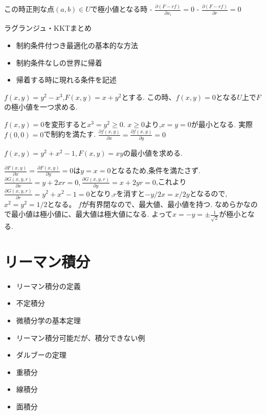 \documentclass{ujarticle}
\begin{document}
この時正則な点$(a,b) \in U$で極小値となる時
  - $\frac{ \partial (F - r f)}{\partial x_i} = 0$
  - $\frac{ \partial (F - r f)}{\partial r} = 0$

\begin{rem}
ラグランジュ・KKTまとめ
\begin{itemize}
\item 制約条件付つき最適化の基本的な方法
\item 制約条件なしの世界に帰着
\item 帰着する時に現れる条件を記述
\end{itemize}
\end{rem}

\begin{epl}
$f(x, y) = y^2 - x^3$,$F(x, y) = x + y^2$とする.
この時、$f(x, y) = 0$となる$U$上で$F$の極小値を一つ求める.
\end{epl}

$f(x, y)  = 0$を変形すると$x^3 = y^2 \ge 0$.
$x \ge 0$より,$x = y =0$が最小となる.
実際$f(0, 0) = 0$で制約を満たす.
$\frac{\partial f(x, y)}{\partial x} = \frac{\partial f(x, y)}{\partial y} = 0$

\begin{epl}
$f(x, y) = y^2 + x^2 - 1, F(x, y) = xy$の最小値を求める.
\end{epl}
$\frac{\partial F(x, y)}{\partial x} = \frac{\partial F(x, y)}{\partial y} = 0$は$y = x =0$となるため,条件を満たさず.
$\frac{\partial G(x, y, r)}{\partial x} = y + 2xr = 0, \frac{\partial G(x, y, r)}{\partial y} = x + 2yr = 0$,これより$\frac{\partial G(x, y, r)}{\partial r} = y^2 + x^2 - 1 = 0$となり,$r$を消すと$- y /2x = x/ 2y$となるので,$x^2 = y^2 = 1/2$となる。
$f$が有界閉なので、最大値、最小値を持つ.
なめらかなので最小値は極小値に、最大値は極大値になる.
よって$x = - y = \pm \frac{1}{\sqrt{2}}$が極小となる.

\section{リーマン積分}
\begin{itemize}
\item リーマン積分の定義
\item 不定積分
\item 微積分学の基本定理
\item リーマン積分可能だが、積分できない例
\item ダルブーの定理
\item 重積分
\item 線積分
\item 面積分
\end{itemize}
\end{document}
